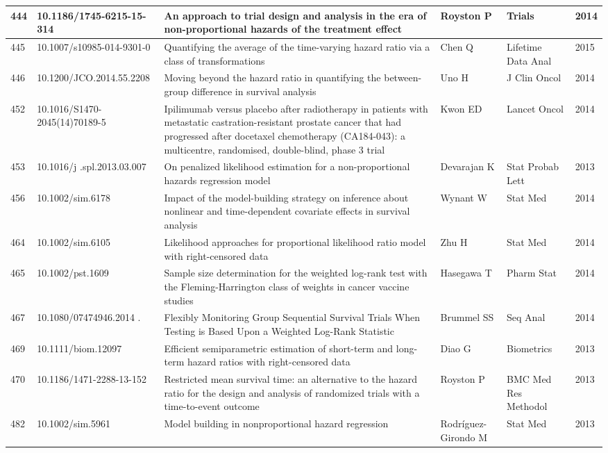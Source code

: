 \begin{landscape}
\begin{longtable}{|p{0.3in}|p{1.8in}|p{2.4in}|p{0.68in}|p{0.89in}|p{0.3in}|}
444 & 10.1186/1745-6215-15-314       & An approach to trial design and analysis in the era of non-proportional hazards of the treatment effect & Royston P & Trials & 2014 \\ \hline 
445 & 10.1007/s10985-014-9301-0      & Quantifying the average of the time-varying hazard ratio via a class of transformations & Chen Q & Lifetime Data Anal & 2015 \\ \hline 
446 & 10.1200/JCO.2014.55.2208    & Moving beyond the hazard ratio in quantifying the between-group difference in survival analysis & Uno H & J Clin Oncol & 2014 \\ \hline 
452 & 10.1016/S1470-2045(14)70189-5 & Ipilimumab versus placebo after radiotherapy in patients with metastatic castration-resistant prostate cancer that had progressed after docetaxel chemotherapy (CA184-043): a multicentre, randomised, double-blind, phase 3 trial & Kwon ED & Lancet Oncol & 2014 \\ \hline 
453 & 10.1016/j .spl.2013.03.007  & On penalized likelihood estimation for a non-proportional hazards regression model & Devarajan K & Stat Probab Lett & 2013 \\ \hline 
456 & 10.1002/sim.6178   & Impact of the model-building strategy on inference about nonlinear and time-dependent covariate effects in survival analysis & Wynant W & Stat Med & 2014 \\ \hline 
464 & 10.1002/sim.6105    & Likelihood approaches for proportional likelihood ratio model with right-censored data & Zhu H & Stat Med & 2014 \\ \hline 
465 & 10.1002/pst.1609   & Sample size determination for the weighted log-rank test with the Fleming-Harrington class of weights in cancer vaccine studies & Hasegawa T & Pharm Stat & 2014 \\ \hline 
467 & 10.1080/07474946.2014 .\-856635   & Flexibly Monitoring Group Sequential Survival Trials When Testing is Based Upon a Weighted Log-Rank Statistic & Brummel SS & Seq Anal & 2014 \\ \hline 
469 & 10.1111/biom.12097   & Efficient semiparametric estimation of short-term and long-term hazard ratios with right-censored data & Diao G & Biometrics & 2013 \\ \hline 
470 & 10.1186/1471-2288-13-152    & Restricted mean survival time: an alternative to the hazard ratio for the design and analysis of randomized trials with a time-to-event outcome & Royston P & BMC Med Res Methodol & 2013 \\ \hline 
482 & 10.1002/sim.5961    & Model building in nonproportional hazard regression & Rodr\'{i}guez-Girondo M & Stat Med & 2013 \\ \hline 

\end{longtable}
\end{landscape}
